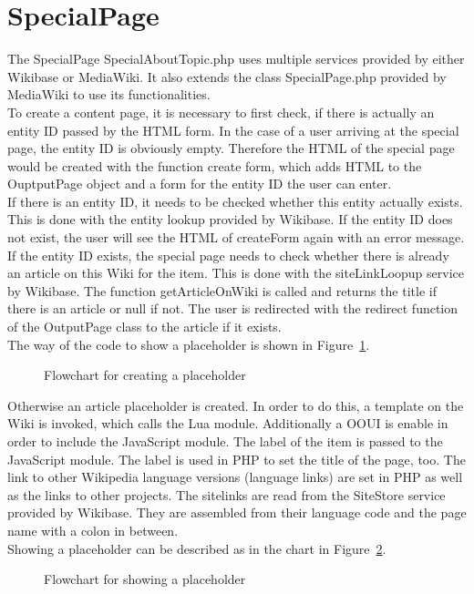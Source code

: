 \section{SpecialPage}

The SpecialPage SpecialAboutTopic.php uses multiple services provided by either Wikibase or MediaWiki. It also extends the class SpecialPage.php provided by MediaWiki to use its functionalities. \\
To create a content page, it is necessary to first check, if there is actually an entity ID passed by the HTML form. In the case of a user arriving at the special page, the entity ID is obviously empty. Therefore the HTML of the special page would be created with the function create form, which adds HTML to the OuptputPage object and a form for the entity ID the user can enter. \\
If there is an entity ID, it needs to be checked whether this entity actually exists. This is done with the entity lookup provided by Wikibase. If the entity ID does not exist, the user will see the HTML of createForm again with an error message.
If the entity ID exists, the special page needs to check whether there is already an article on this Wiki for the item. This is done with the siteLinkLoopup service by Wikibase. The function getArticleOnWiki is called and returns the title if there is an article or null if not. The user is redirected with the redirect function of the OutputPage class to the article if it exists.  \\
The way of the code to show a placeholder is shown in Figure~\ref{fig:createpl}. 
\begin{figure}[ht]
	\centering
	
	\caption{Flowchart for creating a placeholder}
	\label{fig:createpl}
\end{figure}

Otherwise an article placeholder is created. In order to do this, a template on the Wiki is invoked, which calls the Lua module. Additionally a OOUI is enable in order to include the JavaScript module. The label of the item is passed to the JavaScript module. The label is used in PHP to set the title of the page, too. The link to other Wikipedia language versions (language links) are set in PHP as well as the links to other projects. The sitelinks are read from the SiteStore service provided by Wikibase. They are assembled from their language code and the page name with a colon in between. \\
Showing a placeholder can be described as in the chart in Figure~\ref{fig:showpl}. 
\begin{figure}[ht]
	\centering
	
	\caption{Flowchart for showing a placeholder}
	\label{fig:showpl}
\end{figure}
